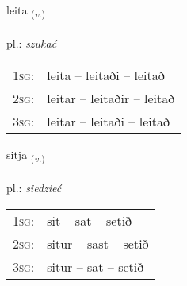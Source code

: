 \documentclass[frontgrid, backgrid]{flacards}\usepackage[]{graphicx}\usepackage[]{xcolor}
\begin{document}
\renewcommand{\flhead}{\vskip5pt \fboxsep=0pt {\small\bfseries\footnotesize Sagnorð | Verb}}
\renewcommand{\fcfoot}{\vskip5pt \fboxsep=0pt \hspace{2pt}{\small\bfseries\footnotesize 1K}}

\renewcommand{\blhead}{\vskip5pt {\small\bfseries\footnotesize Sagnorð | Verb }}
\renewcommand{\bcfoot}{\vskip5pt \hspace{2pt}{\small\bfseries\footnotesize 1K}}


{leita \small{\textsubscript{(\textit{v.})}} \\[1ex] %
\textphonetic{[leiːta]} \\
pl.: \emph{szukać} \\  [2ex]
\renewcommand*{\arraystretch}{0.8}
\begin{tabular}{p{1cm}l}
\textsc{1sg}: & leita -- leitaði -- leitað \\ 
\textsc{2sg}: & leitar -- leitaðir -- leitað \\ 
\textsc{3sg}: & leitar -- leitaði -- leitað \\ 
\end{tabular}
}

\renewcommand{\flhead}{\vskip5pt \fboxsep=0pt {\small\bfseries\footnotesize Sagnorð | Verb}}
\renewcommand{\fcfoot}{\vskip5pt \fboxsep=0pt \hspace{2pt}{\small\bfseries\footnotesize 1K}}

\renewcommand{\blhead}{\vskip5pt {\small\bfseries\footnotesize Sagnorð | Verb }}
\renewcommand{\bcfoot}{\vskip5pt \hspace{2pt}{\small\bfseries\footnotesize 1K}}


{sitja \small{\textsubscript{(\textit{v.})}} \\[1ex] %
\textphonetic{[sɪːtja]} \\
pl.: \emph{siedzieć} \\  [2ex]
\renewcommand*{\arraystretch}{0.8}
\begin{tabular}{p{1cm}l}
\textsc{1sg}: & sit -- sat -- setið \\ 
\textsc{2sg}: & situr -- sast -- setið \\ 
\textsc{3sg}: & situr -- sat -- setið \\ 
\end{tabular}
}
\end{document}
